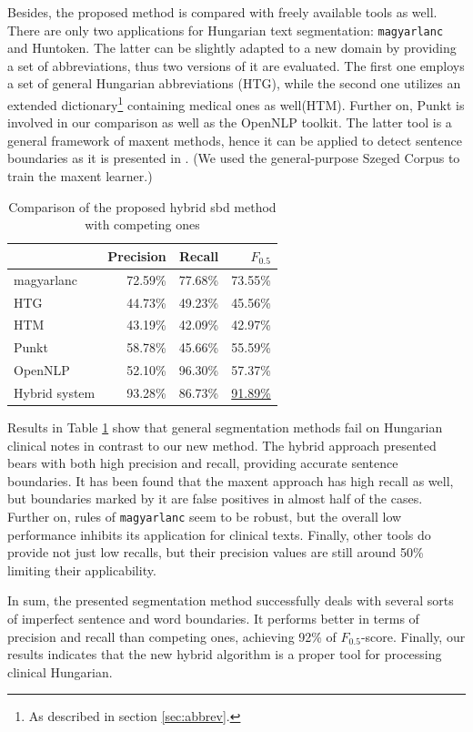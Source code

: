Besides, the proposed method is compared with freely available tools as well.
There are only two applications for Hungarian text segmentation: \texttt{magyarlanc} and Huntoken.
The latter can be slightly adapted to a new domain by providing a set of abbreviations, thus two versions of it are evaluated. 
The first one employs a set of general Hungarian abbreviations (HTG), while the second one utilizes an extended dictionary\footnote{As described in section \ref{sec:abbrev}.} containing medical ones as well(HTM). 
Further on, Punkt \cite{kiss2006unsupervised} is involved in our comparison as well as the OpenNLP \cite{Baldridge2002} toolkit. 
The latter tool is a general framework of \acrlong{maxent} methods, hence it can be applied to detect sentence boundaries as it is presented in \cite{reynar1997maximum}.
(We used the general-purpose Szeged Corpus to train the \acrlong{maxent} learner.) 

\begin{table}[h]
\centering
\caption{Comparison of the proposed hybrid \acrshort{sbd} method with competing ones}
\label{tab:comparison}
\begin{tabular}{ l r r r} 
\hline
& Precision & Recall & $F_{0.5}$ \\
\hline
magyarlanc & 72.59\% & 77.68\% & 73.55\% \\
HTG & 44.73\% & 49.23\% & 45.56\% \\
HTM & 43.19\% & 42.09\% & 42.97\% \\
Punkt & 58.78\% & 45.66\% & 55.59\%  \\
OpenNLP & 52.10\% & 96.30\% & 57.37\% \\
Hybrid system & 93.28\% & 86.73\% & \underline{91.89\%} \\
\hline
\end{tabular}
\end{table}

Results in Table \ref{tab:comparison} show that general segmentation methods fail on Hungarian clinical notes in contrast to our new method. 
The hybrid approach presented bears with both high precision and recall, providing accurate sentence boundaries.
It has been found that the \acrshort{maxent} approach has high recall as well, but boundaries marked by it are false positives in almost half of the cases. 
Further on, rules of \texttt{magyarlanc} seem to be robust, but the overall low performance inhibits its application for clinical texts. 
Finally, other tools do provide not just low recalls, but their precision values are still around 50\% limiting their applicability. 

In sum, the presented segmentation method successfully deals with several sorts of imperfect sentence and word boundaries.
It performs better in terms of precision and recall than competing ones, achieving 92\% of $F_{0.5}$-score. 
Finally, our results indicates that the new hybrid algorithm is a proper tool for processing clinical Hungarian.



